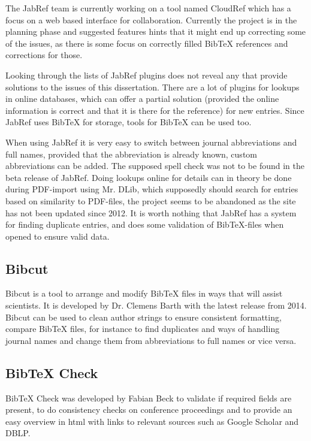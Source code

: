 The JabRef team is currently working on a tool named CloudRef which
has a focus on a web based interface for collaboration.  Currently the
project is in the planning phase and suggested features hints that it
might end up correcting some of the issues, as there is some focus on
correctly filled Bib{\TeX} references and corrections for those.

Looking through the lists of JabRef plugins does not reveal any that
provide solutions to the issues of this dissertation.  There are a lot
of plugins for lookups in online databases, which can offer a partial
solution (provided the online information is correct and that it is
there for the reference) for new entries\cite{jabref_resources}.
Since JabRef uses Bib{\TeX} for storage, tools for Bib{\TeX} can be
used too.

When using JabRef it is very easy to switch between journal
abbreviations and full names, provided that the abbreviation is
already known, custom abbreviations can be
added\cite{jabref_abbreviations}.  The supposed spell check was not to
be found in the beta release of JabRef.  Doing lookups online for
details can in theory be done during PDF-import using Mr. DLib, which
supposedly should search for entries based on similarity to PDF-files,
the project seems to be abandoned as the site has not been updated
since 2012\cite{jabref_mrdlib,jabref_mrdlib_notice}.  It is worth
nothing that JabRef has a system for finding duplicate entries, and
does some validation of Bib{\TeX}-files when opened to ensure valid
data.

\subsection{Bibcut}
Bibcut is a tool to arrange and modify Bib{\TeX} files in ways that
will assist scientists.  It is developed by Dr. Clemens Barth with the
latest release from 2014.  Bibcut can be used to clean author strings
to ensure consistent formatting, compare Bib{\TeX} files, for instance
to find duplicates and ways of handling journal names and change them
from abbreviations to full names or vice versa\cite{bibcut_site}.


\subsection{Bib{\TeX} Check}
Bib{\TeX} Check was developed by Fabian Beck to validate if required
fields are present, to do consistency checks on conference proceedings
and to provide an easy overview in html with links to relevant sources
such as Google Scholar and DBLP.

